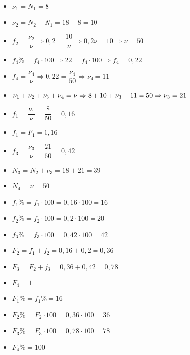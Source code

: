 \documentclass[a4paper,11pt,twoside]{article}
\begin{document}
\begin{multicols}{2}
\begin{itemize}
\item $\nu_1=N_1=8$
\item $\nu_2=N_2-N_1=18-8=10$
\item $f_2=\dfrac{\nu_2}{\nu}\Rightarrow 0{,}2=\dfrac{10}{\nu}\Rightarrow 0{,}2\nu=10\Rightarrow \nu=50$
\item $f_4\%=f_4\cdot 100\Rightarrow 22=f_4\cdot 100\Rightarrow f_4=0{,}22$
\item $f_4=\dfrac{\nu_4}{\nu}\Rightarrow 0{,}22=\dfrac{\nu_4}{50}\Rightarrow \nu_4=11$
\item $\nu_1+\nu_2+\nu_3+\nu_4=\nu\\\Rightarrow 8+10+\nu_3+11=50\Rightarrow\nu_3=21$
\item $f_1=\dfrac{\nu_1}{\nu}=\dfrac{8}{50}=0{,}16$
\item $f_1=F_1=0{,}16$
\item $f_3=\dfrac{\nu_3}{\nu}=\dfrac{21}{50}=0{,}42$
\item $N_3=N_2+\nu_3=18+21=39$
\item $N_4=\nu=50$
\item $f_1\%=f_1\cdot 100=0{,}16\cdot 100=16$
\item $f_2\%=f_2\cdot 100=0{,}2\cdot 100=20$
\item $f_3\%=f_3\cdot 100=0{,}42\cdot 100=42$
\item $F_2=f_1+f_2=0{,}16+0{,}2=0{,}36$
\item $F_3=F_2+f_3=0{,}36+0{,}42=0{,}78$
\item $F_4=1$
\item $F_1\%=f_1\%=16$
\item $F_2\%=F_2\cdot 100=0{,}36\cdot 100=36$
\item $F_3\%=F_3\cdot 100=0{,}78\cdot 100=78$
\item $F_4\%=100$
\end{itemize}
\end{multicols}
\end{document}
